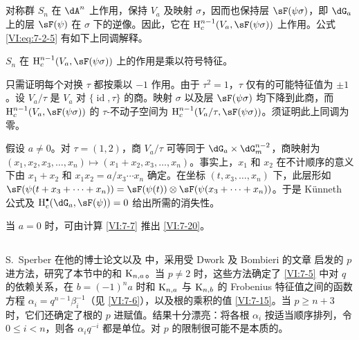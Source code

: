 \subsection{}\label{VI:7-19}

对称群 $S_n$ 在 $\dA^n$ 上作用，保持 $V_a$ 及映射 $\sigma$，因而也保持层 $\sF(\psi\sigma)$，即 $\dG_a$ 上的层 $\sF(\psi)$ 在 $\sigma$ 下的逆像。因此，它在 $\h_c^{n-1}(V_a,\sF(\psi\sigma))$ 上作用。公式 \eqref{VI:eq:7-2-5} 有如下上同调解释。

\begin{proposition_}\label{VI:7-20}
$S_n$ 在 $\h_c^{n-1}(V_a,\sF(\psi\sigma))$ 上的作用是乘以符号特征。
\end{proposition_}

只需证明每个对换 $\tau$ 都按乘以 $-1$ 作用。由于 $\tau^2=1$，$\tau$ 仅有的可能特征值为 $\pm 1$。设 $V_a/\tau$ 是 $V_a$ 对 $\{\operatorname{id},\tau\}$ 的商。映射 $\sigma$ 以及层 $\sF(\psi\sigma)$ 均下降到此商，而 $\h_c^{n-1}(V_a,\sF(\psi\sigma))$ 的 $\tau$-不动子空间为 $\h_c^{n-1}(V_a/\tau,\sF(\psi\sigma))$。须证明此上同调为零。

假设 $a\ne 0$。对 $\tau=(1,2)$，商 $V_a/\tau$ 可等同于 $\dG_a\times \dG_m^{n-2}$，商映射为\newline
$(x_1,x_2,x_3,\dots,x_n)\mapsto (x_1+x_2,x_3,\dots,x_n)$。事实上，$x_1$ 和 $x_2$ 在不计顺序的意义下由 $x_1+x_2$ 和 $x_1x_2 = a/x_3\dotsm x_n$ 确定。在坐标 $(t,x_3,\dots,x_n)$ 下，此层形如 $\sF(\psi(t+x_3+\cdots + x_n)) = \sF(\psi(t))\otimes \sF(\psi(x_3+\cdots + x_n))$。于是 K\"unneth 公式及 $\h_c^\bullet(\dG_a,\sF(\psi)) = 0$ 给出所需的消失性。

当 $a=0$ 时，可由计算 \ref{VI:7-7} 推出 \ref{VI:7-20}。

\subsection{}\label{VI:7-21}

S.\ Sperber 在他的博士论文以及 \cite{sp77} 中，采用受 Dwork 及 Bombieri 的文章 \cite{bo66} 启发的 $p$ 进方法，研究了本节中的和 $\textnormal{K}_{n,a}$。当 $p\ne 2$ 时，这些方法确定了 \ref{VI:7-5} 中对 $q$ 的依赖关系，在 $b=(-1)^n a$ 时和 $\textnormal{K}_{n,a}$ 与 $\textnormal{K}_{n,b}$ 的 Frobenius 特征值之间的函数方程 $\alpha_i = q^{n-1} \beta_i^{-1}$（见 \ref{VI:7-6}），以及根的乘积的值 \ref{VI:7-15}。当 $p\geqslant n+3$ 时，它们还确定了根的 $p$ 进赋值。结果十分漂亮：将各根 $\alpha_i$ 按适当顺序排列，令 $0\leqslant i<n$，则各 $\alpha_i q^{-i}$ 都是单位。对 $p$ 的限制很可能不是本质的。

